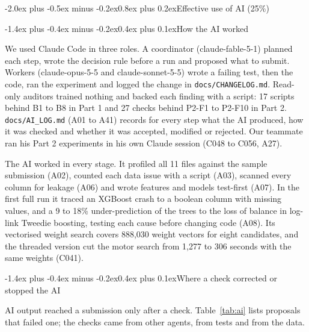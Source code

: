 \documentclass[11pt,a4paper]{article}
\makeatletter
\renewcommand\section{\@startsection{section}{1}{\z@}%
  {-2.0ex plus -0.5ex minus -0.2ex}{0.8ex plus 0.2ex}{\normalfont\large\bfseries}}
\renewcommand\subsection{\@startsection{subsection}{2}{\z@}%
  {-1.4ex plus -0.4ex minus -0.2ex}{0.4ex plus 0.1ex}{\normalfont\normalsize\bfseries}}
\newcommand{\code}[1]{\texttt{#1}}
\makeatother
\begin{document}
\section{Effective use of AI (25\%)}

\subsection{How the AI worked}

We used Claude Code in three roles. A coordinator (claude-fable-5-1) planned each step, wrote the decision rule before
a run and proposed what to submit. Workers (claude-opus-5-5 and claude-sonnet-5-5) wrote a failing test, then the code,
ran the experiment and logged the change in \code{docs/CHANGELOG.md}. Read-only auditors trained nothing and backed each
finding with a script: 17 scripts behind B1 to B8 in Part 1 and 27 checks behind P2-F1 to P2-F10 in Part 2.
\code{docs/AI\_LOG.md} (A01 to A41) records for every step what the AI produced, how it was checked and whether it was
accepted, modified or rejected. Our teammate ran his Part 2 experiments in his own Claude session (C048 to C056, A27).

The AI worked in every stage. It profiled all 11 files against the sample submission (A02), counted each data issue
with a script (A03), scanned every column for leakage (A06) and wrote features and models test-first (A07). In the first full run it traced an XGBoost crash to a boolean column with missing values,
and a 9 to 18\% under-prediction of the trees to the loss of balance in log-link Tweedie boosting, testing each cause
before changing code (A08). Its vectorised weight search covers 888,030 weight vectors for eight candidates, and the
threaded version cut the motor search from 1,277 to 306 seconds with the same weights (C041).

\subsection{Where a check corrected or stopped the AI}

AI output reached a submission only after a check. Table~\ref{tab:ai} lists proposals that failed one; the checks came
from other agents, from tests and from the data.
\end{document}
